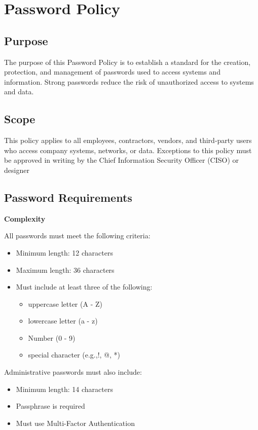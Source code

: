 \chapter{Password Policy}
\pagestyle{fancy}

\fancyhf{}

\fancyfoot[C]{\thepage}

\renewcommand{\headrulewidth}{0pt}
\renewcommand{\footrulewidth}{0pt}

\section{Purpose}
The purpose of this Password Policy is to establish a standard for the creation, protection, and management of passwords used to access systems and information. Strong passwords reduce the risk of unauthorized access to systems and data.
\section{Scope}
This policy applies to all employees, contractors, vendors, and third-party users who access company systems, networks, or data. Exceptions to this policy must be approved in writing by the Chief Information Security Officer (CISO) or designer
\section{Password Requirements}
\textbf{Complexity}

All passwords must meet the following criteria:
\begin{itemize}
    \item Minimum length: 12 characters
    \item Maximum length: 36 characters
    \item Must include at least three of the following:
    \begin{itemize}
        \item uppercase letter (A - Z)
        \item lowercase letter (a - z)
        \item Number (0 - 9)
        \item special character (e.g.,!, @, *)
    \end{itemize}    
\end{itemize}
    Administrative passwords must also include:
\begin{itemize}
    \item Minimum length: 14 characters
    \item Passphrase is required 
    \item Must use Multi-Factor Authentication
\end{itemize}
    
